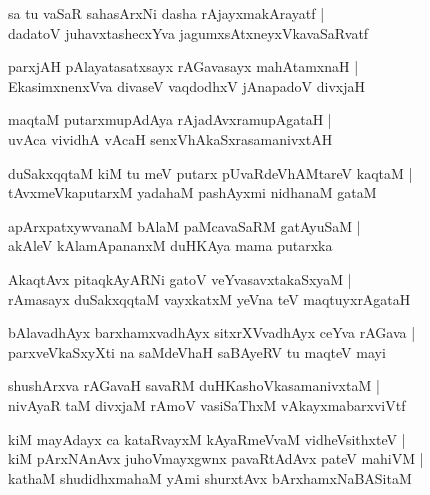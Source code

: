 \begin{shloka}
sa tu vaSaR sahasArxNi dasha rAjayxmakArayatf |\\
dadatoV juhavxtashecxYva jagumxsAtxneyxVkavaSaRvatf 
\end{shloka}

\begin{shloka}
parxjAH pAlayatasatxsayx rAGavasayx mahAtamxnaH |\\
EkasimxnenxVva divaseV vaqdodhxV jAnapadoV divxjaH 
\end{shloka}

\begin{shloka}
maqtaM putarxmupAdAya rAjadAvxramupAgataH |\\
uvAca vividhA vAcaH senxVhAkaSxrasamanivxtAH 
\end{shloka}

\begin{shloka}
duSakxqqtaM kiM tu meV putarx pUvaRdeVhAMtareV kaqtaM |\\
tAvxmeVkaputarxM yadahaM pashAyxmi nidhanaM gataM 
\end{shloka}

\begin{shloka}
apArxpatxywvanaM bAlaM paMcavaSaRM gatAyuSaM |\\
akAleV kAlamApananxM duHKAya mama putarxka 
\end{shloka}

\begin{shloka}
AkaqtAvx pitaqkAyARNi gatoV veYvasavxtakaSxyaM |\\
rAmasayx duSakxqqtaM vayxkatxM yeVna teV maqtuyxrAgataH 
\end{shloka}

\begin{shloka}
bAlavadhAyx barxhamxvadhAyx sitxrXVvadhAyx ceYva rAGava |\\
parxveVkaSxyXti na saMdeVhaH saBAyeRV tu maqteV mayi
\end{shloka}

\begin{shloka}
shushArxva rAGavaH savaRM duHKashoVkasamanivxtaM |\\
nivAyaR taM divxjaM rAmoV vasiSaThxM vAkayxmabarxviVtf
\end{shloka}

\begin{shloka}
kiM mayAdayx ca kataRvayxM kAyaRmeVvaM vidheVsithxteV |\\
kiM pArxNAnAvx juhoVmayxgwnx pavaRtAdAvx pateV mahiVM |\\
kathaM shudidhxmahaM yAmi shurxtAvx bArxhamxNaBASitaM 
\end{shloka}


